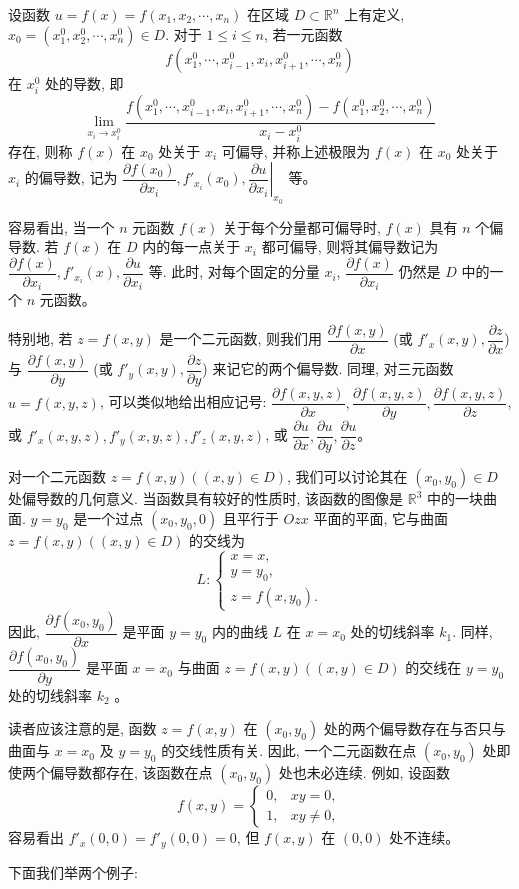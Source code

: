 \documentclass[12pt,fontset=fandol]{ctexart}
\begin{document}
\begin{definition}\label{course-definition-14-1-1}\quad 设函数 $u=f(x)=f(x_1,x_2,\cdots,x_n)$ 在区域 $D\subset\mathbb R^n$ 上有定义, $x_0=(x_1^0,x_2^0,\cdots,x_n^0)\in D$. 对于 $1\leqslant i\leqslant n$, 若一元函数
\[
  f(x_1^0,\cdots,x_{i-1}^0,x_i,x_{i+1}^0,\cdots,x_n^0)
\]
在 $x_i^0$ 处的导数, 即
\[
  \lim_{x_i\to x_i^0}
  \frac{f(x_1^0,\cdots,x_{i-1}^0,x_i,x_{i+1}^0,\cdots,x_n^0)
  -f(x_1^0,x_2^0,\cdots,x_n^0)}{x_i-x_i^0}
\]
存在, 则称 $f(x)$ 在 $x_0$ 处关于 $x_i$ 可偏导, 并称上述极限为 $f(x)$ 在 $x_0$ 处关于 $x_i$ 的偏导数, 记为 $\dfrac{\partial f(x_0)}{\partial x_i}, f'_{x_i}(x_0), \left.\dfrac{\partial u}{\partial x_i}\right|_{x_0}$ 等。

容易看出, 当一个 $n$ 元函数 $f(x)$ 关于每个分量都可偏导时, $f(x)$ 具有 $n$ 个偏导数. 若 $f(x)$ 在 $D$ 内的每一点关于 $x_i$ 都可偏导, 则将其偏导数记为 $\dfrac{\partial f(x)}{\partial x_i}, f'_{x_i}(x), \dfrac{\partial u}{\partial x_i}$ 等. 此时, 对每个固定的分量 $x_i$, $\dfrac{\partial f(x)}{\partial x_i}$ 仍然是 $D$ 中的一个 $n$ 元函数。

特别地, 若 $z=f(x,y)$ 是一个二元函数, 则我们用 $\dfrac{\partial f(x,y)}{\partial x}$ (或 $f'_x(x,y), \dfrac{\partial z}{\partial x}$) 与 $\dfrac{\partial f(x,y)}{\partial y}$ (或 $f'_y(x,y), \dfrac{\partial z}{\partial y}$) 来记它的两个偏导数. 同理, 对三元函数 $u=f(x,y,z)$, 可以类似地给出相应记号: $\dfrac{\partial f(x,y,z)}{\partial x}, \dfrac{\partial f(x,y,z)}{\partial y}, \dfrac{\partial f(x,y,z)}{\partial z}$, 或 $f'_x(x,y,z), f'_y(x,y,z), f'_z(x,y,z)$, 或 $\dfrac{\partial u}{\partial x}, \dfrac{\partial u}{\partial y}, \dfrac{\partial u}{\partial z}$。

对一个二元函数 $z=f(x,y)((x,y)\in D)$, 我们可以讨论其在 $(x_0,y_0)\in D$ 处偏导数的几何意义. 当函数具有较好的性质时, 该函数的图像是 $\mathbb R^3$ 中的一块曲面. $y=y_0$ 是一个过点 $(x_0,y_0,0)$ 且平行于 $Ozx$ 平面的平面, 它与曲面 $z=f(x,y)((x,y)\in D)$ 的交线为
\[
  L:\begin{cases}
    x=x,\\
    y=y_0,\\
    z=f(x,y_0).
  \end{cases}
\]
因此, $\dfrac{\partial f(x_0,y_0)}{\partial x}$ 是平面 $y=y_0$ 内的曲线 $L$ 在 $x=x_0$ 处的切线斜率 $k_1$. 同样, $\dfrac{\partial f(x_0,y_0)}{\partial y}$ 是平面 $x=x_0$ 与曲面 $z=f(x,y)((x,y)\in D)$ 的交线在 $y=y_0$ 处的切线斜率 $k_2$ 。

读者应该注意的是, 函数 $z=f(x,y)$ 在 $(x_0,y_0)$ 处的两个偏导数存在与否只与曲面与 $x=x_0$ 及 $y=y_0$ 的交线性质有关. 因此, 一个二元函数在点 $(x_0,y_0)$ 处即使两个偏导数都存在, 该函数在点 $(x_0,y_0)$ 处也未必连续. 例如, 设函数
\[
  f(x,y)=
  \begin{cases}
    0, & xy=0,\\
    1, & xy\ne0,
  \end{cases}
\]
容易看出 $f'_x(0,0)=f'_y(0,0)=0$, 但 $f(x,y)$ 在 $(0,0)$ 处不连续。

下面我们举两个例子:

\end{definition}
\end{document}
